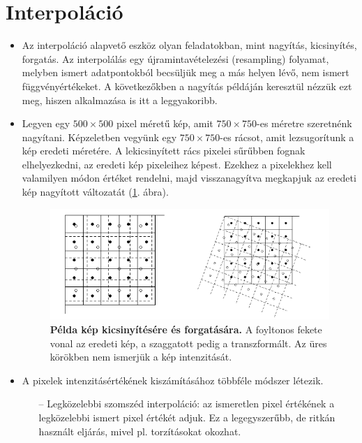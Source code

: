 \documentclass[12pt]{article}
\theoremstyle{plain}
\begin{document}
\section{Interpoláció}

\begin{itemize}
    

\item Az interpoláció alapvető eszköz olyan feladatokban, mint nagyítás, kicsinyítés, forgatás. Az interpolálás egy újramintavételezési (resampling) folyamat, melyben ismert adatpontokból becsüljük meg a más helyen lévő, nem ismert függvényértékeket. A következőkben a nagyítás példáján keresztül nézzük ezt meg, hiszen alkalmazása is itt a leggyakoribb.

\item Legyen egy $500 \times 500$ pixel méretű kép, amit $750 \times 750$-es méretre szeretnénk nagyítani. Képzeletben vegyünk egy $750 \times 750$-es rácsot, amit lezsugorítunk a kép eredeti méretére. A lekicsinyített rács pixelei sűrűbben fognak elhelyezkedni, az eredeti kép pixeleihez képest. Ezekhez a pixelekhez kell valamilyen módon értéket rendelni, majd visszanagyítva megkapjuk az eredeti kép nagyított változatát (\ref{fig:int}. ábra). 

\begin{figure}[H]
    \begin{center}
    \includegraphics[width=0.75\linewidth]{media/interpol.png}
    \caption{\textbf{Példa kép kicsinyítésére és forgatására.} A foyltonos fekete vonal az eredeti kép, a szaggatott pedig a transzformált. Az üres körökben nem ismerjük a kép intenzitását.} 
    \label{fig:int}
    \end{center}
\end{figure}


\item A pixelek intenzitásértékének kiszámításához többféle módszer létezik.
\begin{itemize}

\item[--] Legközelebbi szomszéd interpoláció: az ismeretlen pixel értékének a legközelebbi ismert pixel értékét adjuk. Ez a legegyszerűbb, de ritkán használt eljárás, mivel pl. torzításokat okozhat.


\end{itemize}
\end{itemize}
\end{document}
